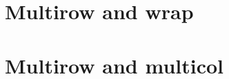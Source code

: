 \documentclass[
]{article}
\begin{document}
\FloatBarrier

\hypertarget{multirow-and-wrap}{%
\section{Multirow and wrap}\label{multirow-and-wrap}}

\FloatBarrier

\hypertarget{multirow-and-multicol}{%
\section{Multirow and multicol}\label{multirow-and-multicol}}

 
  \providecommand{\huxb}[2]{\arrayrulecolor[RGB]{#1}\global\arrayrulewidth=#2pt}
  \providecommand{\huxvb}[2]{\color[RGB]{#1}\vrule width #2pt}
  \providecommand{\huxtpad}[1]{\rule{0pt}{#1}}
  \providecommand{\huxbpad}[1]{\rule[-#1]{0pt}{#1}}
\end{document}
